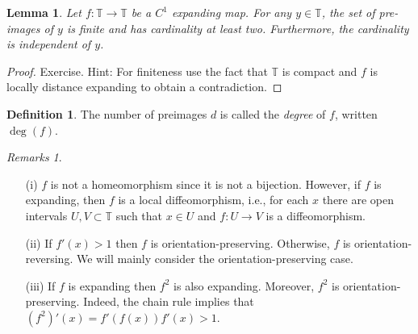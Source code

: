 \documentclass[12pt]{article}
\newtheorem{lemma}[theorem]{Lemma}
\theoremstyle{definition}
\newtheorem{definition}[theorem]{Definition}
\theoremstyle{remark}
\newtheorem{remarks}[theorem]{Remarks}
\begin{document}
\begin{lemma}
Let $f : \mathbb T \to \mathbb T$ be a $C^1$ expanding map. For any $y \in \mathbb T$,
the set of pre-images of $y$ is finite and has cardinality at least two. Furthermore,
the cardinality is independent of $y$.
\end{lemma}

\begin{proof}
Exercise. 
Hint: For finiteness use the fact that $\mathbb T$ is compact and $f$ is locally distance expanding 
to obtain a contradiction.
%
%
\end{proof}

\begin{definition}
The number of preimages $d$ is called the {\it degree}
 of $f$, written $\deg(f)$.
 \end{definition}




\begin{remarks}
\begin{enumerate}
\item[(i)]
$f$ is  not a homeomorphism since it is not a bijection. However, if $f$
is expanding, then $f$ is a local diffeomorphism, i.e., for each $x$ there are open intervals
$U,V \subset \mathbb T$ such that $x \in U$ and $f : U \to V$ is a diffeomorphism.
\item[(ii)]
If $f'(x) > 1$ then $f$ is orientation-preserving. Otherwise, $f$ is orientation-reversing. We
will mainly consider the orientation-preserving case.
\item[(iii)]
If $f$ is expanding then $f^2$ is also expanding. Moreover, $f^2$ is orientation-preserving.
Indeed, the chain rule implies that $(f^2)'(x) = f'(f(x))f'(x) > 1$.
\end{enumerate}
\end{remarks}
\end{document}

